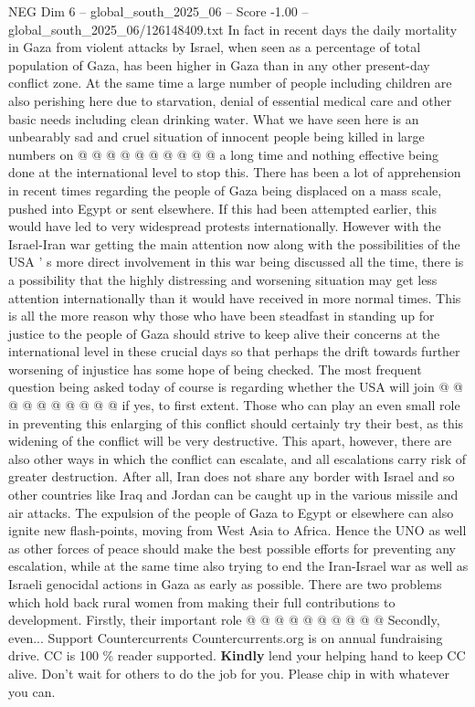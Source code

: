 \begin{textsample}{NEG Dim 6 – global\_south\_2025\_06 – Score -1.00 – global\_south\_2025\_06/126148409.txt}
In fact in recent days the daily mortality in Gaza from violent attacks by Israel, when seen as a percentage of total population of Gaza, has been higher in Gaza than in any other present-day conflict zone.
At the same time a large number of people including children are also perishing here due to starvation, denial of essential medical care and other basic needs including clean drinking water.
What we have seen here is an unbearably sad and cruel situation of innocent people being killed in large numbers on @ @ @ @ @ @ @ @ @ @ a long time and nothing effective being done at the international level to stop this.
There has been a lot of apprehension in recent times regarding the people of Gaza being displaced on a mass scale, pushed into Egypt or sent elsewhere.
If this had been attempted earlier, this would have led to very widespread protests internationally.
However with the Israel-Iran war getting the main attention now along with the possibilities of the USA ' s more direct involvement in this war being discussed all the time, there is a possibility that the highly distressing and worsening situation may get less attention internationally than it would have received in more normal times.
This is all the more reason why those who have been steadfast in standing up for justice to the people of Gaza should strive to keep alive their concerns at the international level in these crucial days so that perhaps the drift towards further worsening of injustice has some hope of being checked.
The most frequent question being asked today of course is regarding whether the USA will join @ @ @ @ @ @ @ @ @ @ if yes, to first extent.
Those who can play an even small role in preventing this enlarging of this conflict should certainly try their best, as this widening of the conflict will be very destructive.
This apart, however, there are also other ways in which the conflict can escalate, and all escalations carry risk of greater destruction.
After all, Iran does not share any border with Israel and so other countries like Iraq and Jordan can be caught up in the various missile and air attacks.
The expulsion of the people of Gaza to Egypt or elsewhere can also ignite new flash-points, moving from West Asia to Africa.
Hence the UNO as well as other forces of peace should make the best possible efforts for preventing any escalation, while at the same time also trying to end the Iran-Israel war as well as Israeli genocidal actions in Gaza as early as possible.
There are two problems which hold back rural women from making their full contributions to development.
Firstly, their important role @ @ @ @ @ @ @ @ @ @ Secondly, even...
Support Countercurrents Countercurrents.org is on annual fundraising drive.
CC is 100 \% reader supported. \textbf{Kindly} lend your helping hand to keep CC alive.
Don't wait for others to do the job for you.
Please chip in with whatever you can.

\end{textsample}
